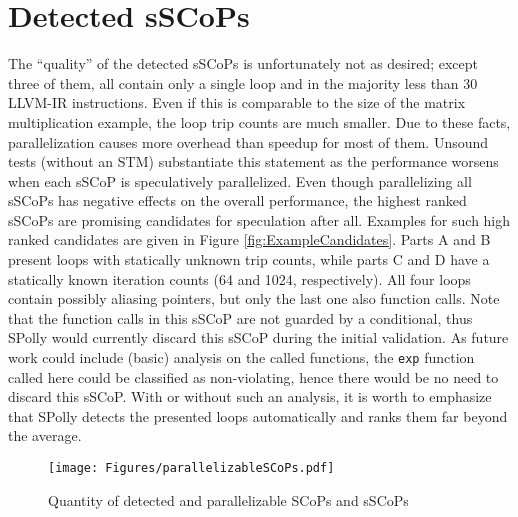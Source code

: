 \section{Detected sSCoPs} 
The ``quality'' of  the detected sSCoPs is unfortunately not as desired;  
except three of them, all contain only a single loop and in the majority 
less than 30 LLVM-IR instructions. Even if this is 
comparable to the size of the matrix multiplication example,
the loop trip counts are much smaller. Due to these facts, parallelization causes
more overhead than speedup for most of them. Unsound 
tests (without an STM) substantiate this statement as the performance worsens 
when each sSCoP is speculatively parallelized. 
Even though parallelizing all sSCoPs has negative effects on the overall 
performance, 
the highest ranked sSCoPs are promising candidates for speculation after all. 
Examples for such high ranked candidates are given in Figure \ref{fig:ExampleCandidates}. 
Parts {\footnotesize A}  and {\footnotesize B} present loops with statically 
unknown trip counts, while parts {\footnotesize C} 
and {\footnotesize D} have a statically known iteration counts (64 and 1024, respectively).
All four loops contain possibly aliasing pointers, but only the last one also 
function calls. Note that the function calls in this sSCoP are not guarded by a conditional, 
thus SPolly would currently discard this sSCoP during the initial validation.  
As future work could include (basic) analysis on the called functions, 
the \texttt{exp} function called here could be classified as non-violating,
hence there would be no need to discard this sSCoP. With or without such an analysis, it is 
worth to emphasize that SPolly detects the presented loops automatically 
and ranks them far beyond the average. 



\begin{figure}[htbp]
  \centering
  \texttt{[image: Figures/parallelizableSCoPs.pdf]}
  \caption{Quantity of detected and parallelizable SCoPs and sSCoPs}
  \label{fig:ParallelizableSCoPs}
\end{figure}




